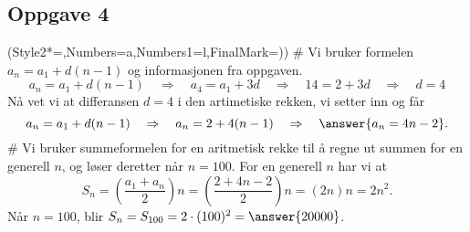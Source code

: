 \subsection*{Oppgave 4}
\begin{easylist}[enumerate]
	\ListProperties(Style2*=,Numbers=a,Numbers1=l,FinalMark={)})
	# Vi bruker formelen $a_n = a_1 + d(n-1)$ og informasjonen fra oppgaven.
	\begin{equation*}
		a_n = a_1 + d(n-1) \quad \Rightarrow \quad 
		a_4 = a_1 + 3d \quad \Rightarrow \quad 
		14 = 2 + 3d \quad \Rightarrow \quad
		d = 4
	\end{equation*}
	Nå vet vi at differansen $d=4$ i den artimetiske rekken, vi setter inn og får
	\begin{equation*}
		a_n = a_1 + d(n-1) \quad \Rightarrow \quad  
		a_n = 2 + 4(n-1) \quad \Rightarrow \quad
		\answer{a_n = 4n - 2}.
	\end{equation*}
	# Vi bruker summeformelen for en aritmetisk rekke til å regne ut summen for en generell $n$, og løser deretter når $n = 100$.
	For en generell $n$ har vi at
	\begin{equation*}
		S_n = \left(\frac{a_1 + a_n}{2}\right) n 
		= \left(\frac{2 + 4n - 2}{2}\right) n
		= \left( 2n\right) n = 2n^2.
	\end{equation*}
	Når $n= 100$, blir $S_n = S_{100} = 2 \cdot (100)^2 = \answer{20000}$.
\end{easylist}

